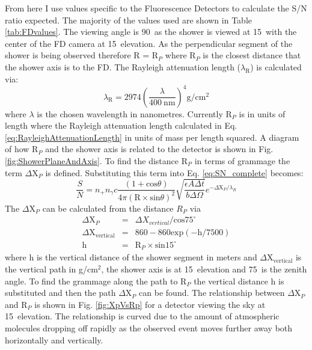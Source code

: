 From here I use values specific to the Fluorescence Detectors to calculate the S/N ratio expected. The majority of the values used are shown in Table \ref{tab:FDvalues}. The viewing angle is 90\textdegree \ as the shower is viewed at 15\textdegree \ with the center of the FD camera at 15\textdegree \ elevation. As the perpendicular segment of the shower is being observed therefore R = R$_P$ where R$_P$ is the closest distance that the shower axis is to the FD. The Rayleigh attenuation length ($\lambda_{\mathrm{R}}$) is calculated via:
\begin{equation}
\lambda_{\mathrm{R}} = 2974 \left(\frac{\lambda}{400 \ \mathrm{nm}} \right)^4 \mathrm{g}/\mathrm{cm}^2 \label{eq:RayleighAttenuationLength}
\end{equation}
where $\lambda$ is the chosen wavelength in nanometres. Currently R$_P$ is in units of length where the Rayleigh attenuation length calculated in Eq. \ref{eq:RayleighAttenuationLength} in units of mass per length squared. A diagram of how R$_P$ and the shower axis is related to the detector is shown in Fig. \ref{fig:ShowerPlaneAndAxis}. To find the distance R$_P$ in terms of grammage the term $\Delta$X$_P$ is defined. Substituting this term into Eq. \ref{eq:SN_complete} becomes:
\begin{equation}
\frac{S}{N} = n_+ n_{\gamma} c \frac{(1 + \mathrm{cos}\theta)}{4 \pi (\mathrm{R} \times \mathrm{sin}\theta)^2} \sqrt{\frac{\epsilon A \Delta t}{b \Delta\Omega}} e^{-\Delta \mathrm{X}_P / \lambda_R}
\end{equation}
The $\Delta$X$_P$ can be calculated from the distance $R_P$ via
\begin{eqnarray}
\Delta \mathrm{X}_P &=& \Delta X_{vertical} / \mathrm{cos}75^{\circ} \\
\Delta \mathrm{X}_{\mathrm{vertical}} &=& 860 - 860\mathrm{exp}(-\mathrm{h}/7500) \\
\mathrm{h} &=& \mathrm{R}_P \times \mathrm{sin}15^{\circ}
\end{eqnarray}
where h is the vertical distance of the shower segment in meters and $\Delta$X$_{\mathrm{vertical}}$ is the vertical path in g/cm$^2$, the shower axis is at 15\textdegree \ elevation and 75\textdegree \ is the zenith angle. To find the grammage along the path to R$_P$ the vertical distance h is substituted and then the path $\Delta$X$_P$ can be found. The relationship between $\Delta$X$_P$ and R$_P$ is shown in Fig. \ref{fig:XpVsRp} for a detector viewing the sky at 15\textdegree \ elevation. The relationship is curved due to the amount of atmospheric molecules dropping off rapidly as the observed event moves further away both horizontally and vertically.


